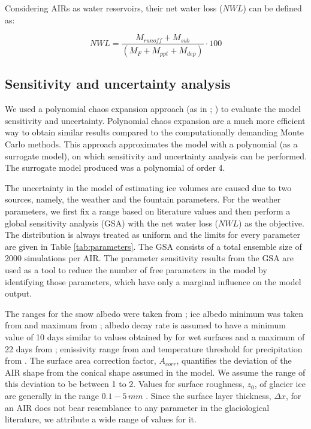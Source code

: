 \documentclass[utf8]{frontiersSCNS} %
\begin{document}
Considering AIRs as water reservoirs, their net water loss ($NWL$) can be defined as:

\begin{equation} \textit{NWL} = \frac{M_{runoff}+M_{sub}}{(M_F+M_{ppt}+M_{dep})} \cdot 100 \end{equation}

\subsection{Sensitivity and uncertainty analysis}

We used a polynomial chaos expansion approach (as in \cite{uncertainpy_2018}; \cite{Xiu_2005}) to evaluate the
model sensitivity and uncertainty. Polynomial chaos expansion are a much more efficient way to obtain similar
results compared to the computationally demanding Monte Carlo methods. This approach approximates the model with a
polynomial (as a surrogate model), on which sensitivity and uncertainty analysis can be performed.  The surrogate
model produced was a polynomial of order 4.

The uncertainty in the model of estimating ice volumes are caused due to two sources, namely, the weather
and the fountain parameters. For the weather parameters, we first fix a range based on literature values
and then perform a global sensitivity analysis (GSA) with the net water loss ($NWL$) as the objective. The
distribution is always treated as uniform and the limits for every parameter are given in Table
\ref{tab:parameters}. The GSA consists of a total ensemble size of 2000 simulations per AIR. The parameter
sensitivity results from the GSA are used as a tool to reduce the number of free parameters in the model by
identifying those parameters, which have only a marginal influence on the model output.

The ranges for the snow albedo were taken from \cite{ZollesMaussion_2019}; ice albedo minimum was taken from
\cite{steiner_2015} and maximum from \cite{ZollesMaussion_2019}; albedo decay rate is assumed to have a minimum
value of 10 days similar to values obtained by \cite{Schmidt_2017} for wet surfaces and a maximum of 22 days from
\cite{OerlemansKnap_1998}; emissivity range from \cite{steiner_2015} and temperature threshold for precipitation
from \cite{Zhou_2010}. The surface area correction factor, $A_{corr}$, quantifies the deviation of the AIR shape
from the conical shape assumed in the model. We assume the range of this deviation to be between 1 to 2. Values for
surface roughness, $z_{0}$, of glacier ice are generally in the range $0.1-5\, mm$ \citep{BrockWillisSharp_2006}.
Since the surface layer thickness, $\Delta x$, for an AIR does not bear resemblance to any parameter in the
glaciological literature, we attribute a wide range of values for it.
\end{document}
